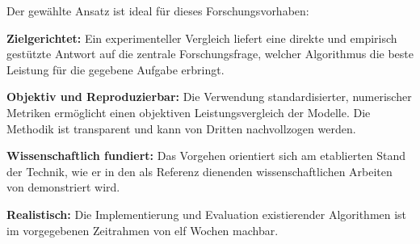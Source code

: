 Der gewählte Ansatz ist ideal für dieses Forschungsvorhaben:

\textbf{Zielgerichtet:} Ein experimenteller Vergleich liefert eine direkte und empirisch gestützte Antwort auf die zentrale Forschungsfrage, welcher Algorithmus die beste Leistung für die gegebene Aufgabe erbringt.

\textbf{Objektiv und Reproduzierbar:} Die Verwendung standardisierter, numerischer Metriken ermöglicht einen objektiven Leistungsvergleich der Modelle. Die Methodik ist transparent und kann von Dritten nachvollzogen werden.

\textbf{Wissenschaftlich fundiert:} Das Vorgehen orientiert sich am etablierten Stand der Technik, wie er in den als Referenz dienenden wissenschaftlichen Arbeiten von \textcite{allegue2023, garcia-mendez2020, kotios2022, ta2023} demonstriert wird.

\textbf{Realistisch:} Die Implementierung und Evaluation existierender Algorithmen ist im vorgegebenen Zeitrahmen von elf Wochen machbar.
